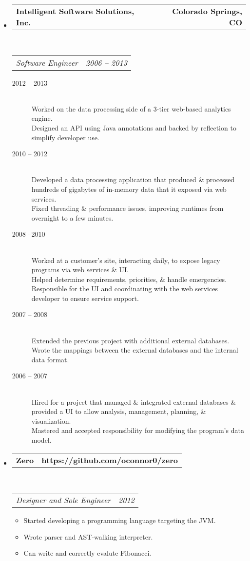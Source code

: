 \documentclass[10pt,letterpaper]{article}
\makeatletter
\newcommand{\headerrow}[2]
{\begin{tabular*}{\linewidth}{l@{\extracolsep{\fill}}r}
	#1 &
	#2 \\
\end{tabular*}}
\makeatother
\begin{document}
\begin{itemize}
	\item
	\headerrow
		{\textbf{Intelligent Software Solutions, Inc.}}
		{\textbf{Colorado Springs, CO}}
	\\
	\headerrow
		{\emph{Software Engineer}}
		{\emph{2006 -- 2013}}
	\begin{description}
		\item[2012 -- 2013] \hfill \\
				Worked on the data processing side of a 3-tier web-based analytics engine. \\
				Designed an API using Java annotations and backed by reflection to simplify developer use.
		\item[2010 -- 2012] \hfill \\
				Developed a data processing application that produced \& processed hundreds of gigabytes of in-memory data that it exposed via web services. \\
				Fixed threading \& performance issues, improving runtimes from overnight to a few minutes.
		\item[2008 --2010] \hfill \\
				Worked at a customer’s site, interacting daily, to expose legacy programs via web services \& UI. \\
				Helped determine requirements, priorities, \& handle emergencies. \\
				Responsible for the UI and coordinating with the web services developer to ensure service support.
		\item[2007 -- 2008] \hfill \\
				Extended the previous project with additional external databases. \\
				Wrote the mappings between the external databases and the internal data format.
		\item[2006 -- 2007] \hfill \\
				Hired for a project that managed \& integrated external databases \& provided a UI to allow analysis, management, planning, \& visualization. \\
				Mastered and accepted responsibility for modifying the program’s data model.
	\end{description}

	\item
	\headerrow
		{\textbf{Zero}}
		{\textbf{https://github.com/oconnor0/zero}}
	\\
	\headerrow
		{\emph{Designer and Sole Engineer}}
		{\emph{2012}}
	\begin{itemize}
		\item Started developing a programming language targeting the JVM.
		\item Wrote parser and AST-walking interpreter.
		\item Can write and correctly evalute Fibonacci.
	\end{itemize}


\end{itemize}
\end{document}
